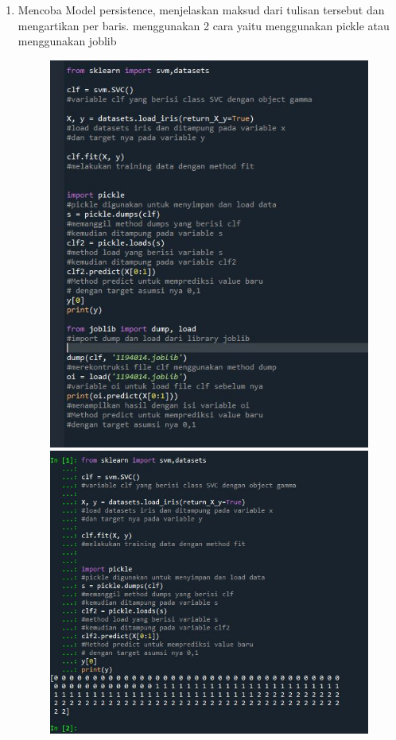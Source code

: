 \begin{enumerate}
\item
Mencoba Model persistence, menjelaskan maksud dari tulisan tersebut dan mengartikan per baris. menggunakan 2 cara yaitu menggunakan pickle atau menggunakan joblib
\begin{figure}[!htbp]
    \centering
    \includegraphics[scale=0.4]{figures/5.JPG}\\
    \includegraphics[scale=0.3]{figures/5.1.JPG}
    \end{figure}


\end{enumerate}
